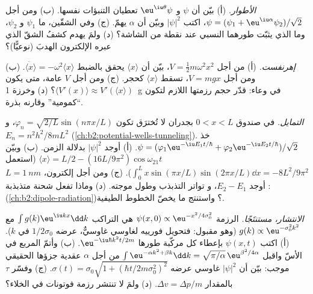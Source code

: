 \begin{exercise}[$\star\star$]\label{exo:b2:schrodinger-wave-functions:8}
\emph{الأطوار.} (أ) بيّن أن $\psi$ و $\eu^{\iu\theta}\psi$ تعطيان التنبؤات
نفسها. (ب) ومن أجل $\psi = (\psi_1 + \eu^{\iu\alpha}\psi_2)/\sqrt2$، اكتب
$|\psi|^2$ وبيّن أن $\alpha$ يهمّ. (ج) وفي الشقّين، ما
$\psi_1$ و $\psi_2$، وما الذي يثبّت طورهما النسبي عند نقطة
من الشاشة؟ (د) ولمَ يهدم كشفُ الشقّ الذي عبره الإلكترون
الهدبَ (نوعيًّا)؟
\end{exercise}

\begin{exercise}[$\star\star$]\label{exo:b2:schrodinger-wave-functions:9}
\emph{إهرنفست.} (أ) من أجل $V = \tfrac12m\omega^2x^2$، بيّن أن $\langle
x\rangle$ يحقق بالضبط $\ddot{\langle x\rangle} = -\omega^2\langle x\rangle$.
(ب) ومن أجل $V = mgx$، تسقط $\langle x\rangle$ كحجر. (ج) ومن أجل $V$
عامة، متى يكون $\langle V'(x)\rangle \approx V'(\langle x\rangle)$؟ (د) وخرزة
\qty{1}{g} في وعاء: قدّر حجم رزمتها اللازم
لتكون ``كمومية'' وقارنه بذرة.
\end{exercise}

\begin{exercise}[$\star\star\star$]\label{exo:b2:schrodinger-wave-functions:10}
\emph{التمايل.} في صندوق $0 < x < L$ بجدران لا تُخترَق تكون
 $\varphi_n = \sqrt{2/L}\sin(n\pi x/L)$، و $E_n =
n^2h^2/8mL^2$ (\cref{ch:b2:potential-wells-tunneling}). خذ $\psi =
(\varphi_1\eu^{-\iu E_1t/\hbar} + \varphi_2\eu^{-\iu E_2t/\hbar})/\sqrt2$. (أ)
أوجد $|\psi|^2$ بدلالة الزمن. (ب) وبيّن $\langle x\rangle = L/2 -
(16L/9\pi^2)\cos\omega_{21}t$ (استعمل $\int_0^L x\sin(\pi x/L)\sin(2\pi x/L)\dd x
= -8L^2/9\pi^2$). (ج) ومن أجل إلكترون، $L = \qty{1}{nm}$: أوجد $E_2 - E_1$، و
تواتر التذبذب وطول موجته. (د) وماذا تفعل شحنة
متذبذبة (\cref{ch:b2:dipole-radiation})؟ واستنتج ما يخصّ
الخطوط الطيفية.
\end{exercise}

\begin{exercise}[$\star\star\star$]\label{exo:b2:schrodinger-wave-functions:11}
\emph{الانتشار، مستنتَجًا.} الرزمة $\psi(x,0) \propto \eu^{-x^2/4\sigma_0^2}$
هي التراكب $\int g(k)\eu^{\iu kx}\dd k$ مع $g(k) \propto
\eu^{-\sigma_0^2k^2}$ (وهو مقبول: فتحويل فورييه لغاوسي
غاوسيٌّ، عرضه $1/2\sigma_0$ في $k$). (أ) اكتب $\psi(x,t)$ بإعطاء كل
مركّبة طورها $\eu^{-\iu\hbar k^2t/2m}$. (ب) وأتمّ المربع في
الأسّ واقبل $\int\eu^{-\alpha k^2 + \beta k}\dd k = \sqrt{\pi/\alpha}\,
\eu^{\beta^2/4\alpha}$ من أجل $\alpha$ عقدية جزؤها الحقيقي موجب: بيّن أن
$|\psi|^2$ غاوسي عرضه $\sigma(t) = \sigma_0\sqrt{1 + (\hbar t/2m
\sigma_0^2)^2}$. (ج) وفسّر $\tau$ بالمقدار $\Delta v = \Delta p/m$. (د) ولمَ
لا تنتشر رزمة فوتونات في الخلاء؟
\end{exercise}

